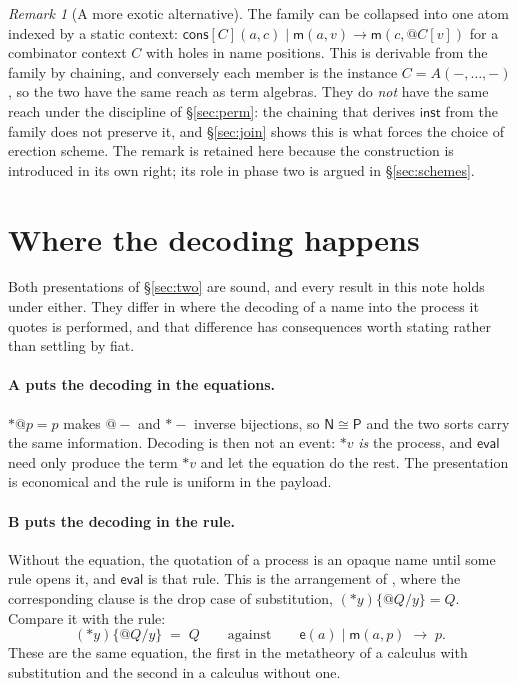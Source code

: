 \documentclass[11pt]{article}
\makeatletter
\theoremstyle{plain}
\theoremstyle{definition}
\theoremstyle{remark}
\newtheorem{remark}[theorem]{Remark}
\newcommand{\quo}[1]{@#1}
\newcommand{\drp}[1]{{*}#1}
\newcommand{\mm}{\mathsf{m}}
\newcommand{\ev}{\mathsf{e}}
\newcommand{\cons}{\mathsf{cons}}
\newcommand{\inst}{\mathsf{inst}}
\newcommand{\red}{\longrightarrow}
\makeatother
\begin{document}
\begin{remark}[A more exotic alternative]
\label{rem:ctxindexed}
The family can be collapsed into one atom indexed by a static context:
$\cons[C](a,c) \mid \mm(a,v) \red \mm(c,\quo{C[v]})$ for a combinator context
$C$ with holes in name positions. This is derivable from the family by chaining, and conversely each member is
the instance $C = A(-,\dots,-)$, so the two have the same reach as term
algebras. They do \emph{not} have the same reach under the discipline of
\S\ref{sec:perm}: the chaining that derives $\inst$ from the family does not
preserve it, and \S\ref{sec:join} shows this is what forces the choice of
erection scheme. The remark is retained here because the construction is
introduced in its own right; its role in phase two is argued in
\S\ref{sec:schemes}.
\end{remark}

\section{Where the decoding happens}
\label{sec:why}

Both presentations of \S\ref{sec:two} are sound, and every result in this
note holds under either. They differ in where the decoding of a name into
the process it quotes is performed, and that difference has consequences
worth stating rather than settling by fiat.

\paragraph{A puts the decoding in the equations.} $\drp{\quo{p}} = p$ makes
$\quo{-}$ and $\drp{-}$ inverse bijections, so $\mathsf{N} \cong \mathsf{P}$
and the two sorts carry the same information. Decoding is then not an event:
$\drp{v}$ \emph{is} the process, and $\mathsf{eval}$ need only produce the
term $\drp{v}$ and let the equation do the rest. The presentation is
economical and the rule is uniform in the payload.

\paragraph{B puts the decoding in the rule.} Without the equation, the
quotation of a process is an opaque name until some rule opens it, and
$\mathsf{eval}$ is that rule. This is the arrangement of
\cite{MeredithRadestock05}, where the corresponding clause is the drop case
of substitution, $(\drp{y})\{\quo{Q}/y\} = Q$. Compare it with the rule:
\[
  (\drp{y})\{\quo{Q}/y\} \;=\; Q
  \qquad\text{against}\qquad
  \ev(a) \mid \mm(a,p) \;\red\; p .
\]
These are the same equation, the first in the metatheory of a calculus with
substitution and the second in a calculus without one.
\end{document}
